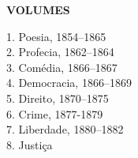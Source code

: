 \begingroup\footnotesize\parindent0pt\vspace*{3em}

\thispagestyle{empty}
{\formular\bfseries VOLUMES}\smallskip

1. Poesia, 1854--1865\\
2. Profecia, 1862--1864\\
3. Comédia, 1866--1867\\
4. Democracia, 1866--1869\\
5. Direito, 1870--1875\\
6. Crime, 1877-1879\noindent\\
7. Liberdade, 1880--1882\\
8. Justiça

\endgroup
\pagebreak